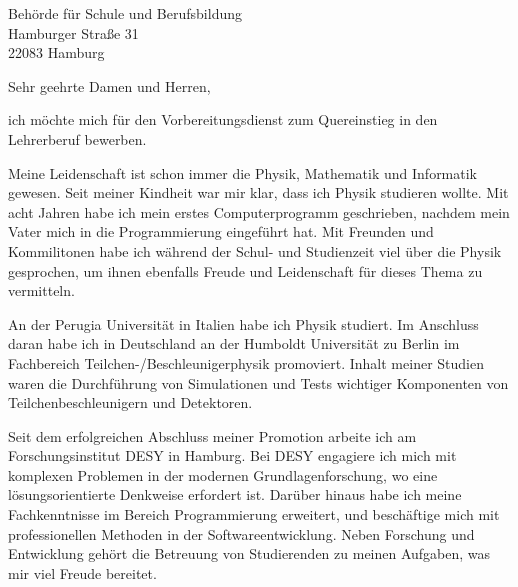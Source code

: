 \documentclass[ebner,paper=a4,fontsize=11pt,ngerman,BCOR=10mm]{scrlttr2}%
\begin{document}
\pagestyle{empty}

\begin{letter}{ Beh{\"o}rde f{\"u}r Schule und Berufsbildung\\
Hamburger Stra{\ss}e 31\\ 
22083 Hamburg}


\opening{Sehr geehrte Damen und Herren,} 

ich m{\"o}chte mich f{\"u}r den Vorbereitungsdienst zum Quereinstieg in den
Lehrerberuf bewerben.

Meine Leidenschaft ist schon immer die Physik,  Mathematik und  Informatik
gewesen. Seit meiner Kindheit war mir klar, dass ich Physik studieren wollte.
Mit acht Jahren habe ich mein erstes Computerprogramm geschrieben, nachdem mein
Vater mich in die Programmierung eingef{\"u}hrt hat. Mit Freunden und
Kommilitonen habe ich w{\"a}hrend der Schul- und Studienzeit viel {\"u}ber die
Physik gesprochen, um ihnen ebenfalls Freude und Leidenschaft f{\"u}r dieses
Thema zu vermitteln.


An der Perugia Universit{\"a}t in Italien habe ich Physik studiert. Im
Anschluss daran habe ich in Deutschland an der Humboldt Universit{\"a}t zu
Berlin im Fachbereich Teilchen-/Beschleunigerphysik promoviert. Inhalt meiner
Studien waren die Durchf{\"u}hrung von Simulationen und Tests wichtiger
Komponenten von Teilchenbeschleunigern und Detektoren.

Seit dem erfolgreichen Abschluss meiner Promotion arbeite ich am
Forschungsinstitut DESY in Hamburg. Bei DESY engagiere ich mich mit komplexen
Problemen in der modernen Grundlagenforschung, wo eine l{\"o}sungsorientierte
Denkweise erfordert ist. Dar{\"u}ber hinaus habe ich meine Fachkenntnisse im
Bereich Programmierung erweitert, und besch{\"a}ftige mich mit professionellen
Methoden in der Softwareentwicklung. Neben Forschung und Entwicklung geh{\"o}rt
die Betreuung von Studierenden zu meinen Aufgaben, was mir viel Freude bereitet.




\end{letter}
\end{document}
